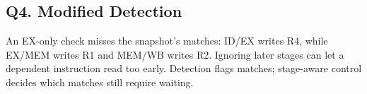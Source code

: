 \documentclass[11pt,letterpaper]{article}
\begin{document}
\subsection*{Q4. Modified Detection}
An EX-only check misses the snapshot's matches: ID/EX writes R4, while EX/MEM writes R1 and MEM/WB writes R2. Ignoring later stages can let a dependent instruction read too early. Detection flags matches; stage-aware control decides which matches still require waiting.
\end{document}
